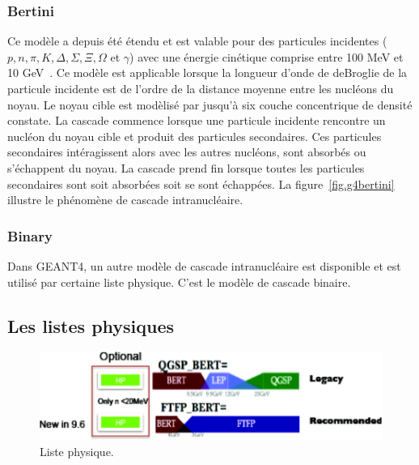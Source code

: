 \subsubsection{Bertini}
Ce modèle a depuis été étendu et est valable pour des particules incidentes ($p,n,\pi,K,\Delta,\Sigma,\Xi,\Omega$ et $\gamma$) avec une énergie cinétique comprise entre 100 MeV et 10 GeV~\cite{geant4_bertini}. Ce modèle est applicable lorsque la longueur d'onde de deBroglie de la particule incidente est de l'ordre de la distance moyenne entre les nucléons du noyau. Le noyau cible est modèlisé par jusqu'à six couche concentrique de densité constate. La cascade commence lorsque une particule incidente rencontre un nucléon du noyau cible et produit des particules secondaires. Ces particules secondaires intéragissent alors avec les autres nucléons, sont absorbés ou s'échappent du noyau. La cascade prend fin lorsque toutes les particules secondaires sont soit absorbées soit se sont échappées. La figure~\ref{fig.g4bertini} illustre le phénomène de cascade intranucléaire.
\subsubsection{Binary}
Dans GEANT4, un autre modèle de cascade intranucléaire est disponible et est utilisé par certaine liste physique. C'est le modèle de cascade binaire. 
\subsection{Les listes physiques}
\label{sec.listphys}
\begin{figure}[!ht]
  \begin{center}
    \includegraphics[width=.8\textwidth]{Digitizer/figs/physics_list_G4.pdf}
    \caption{Liste physique.}
    \label{fig.g4list}
  \end{center}
\end{figure}


